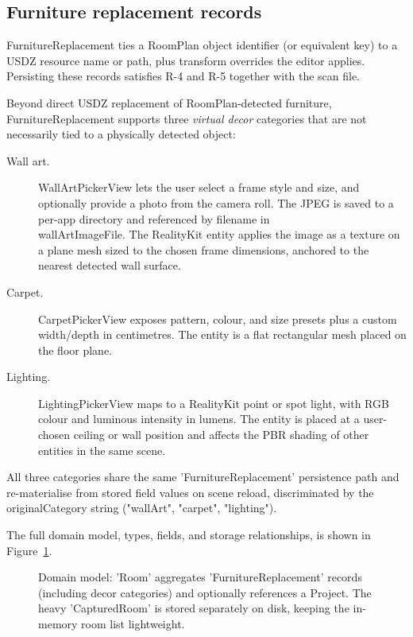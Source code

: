 \subsection{Furniture replacement records}

FurnitureReplacement ties a RoomPlan object identifier (or equivalent key) to a USDZ resource name or path, plus transform overrides the editor applies. Persisting these records satisfies R-4 and R-5 together with the scan file.

Beyond direct USDZ replacement of RoomPlan-detected furniture,
\\ 
FurnitureReplacement supports three \emph{virtual decor} categories that are not necessarily tied to a physically detected object:

\begin{description}
    \item[Wall art.] WallArtPickerView lets the user select a frame style and size, and optionally provide a photo from the camera roll. The JPEG is saved to a per-app directory and referenced by filename in \\ wallArtImageFile. The RealityKit entity applies the image as a texture on a plane mesh sized to the chosen frame dimensions, anchored to the nearest detected wall surface.

    \item[Carpet.] CarpetPickerView exposes pattern, colour, and size presets plus a custom width/depth in centimetres. The entity is a flat rectangular mesh placed on the floor plane.

    \item[Lighting.] LightingPickerView maps to a RealityKit point or spot light, with RGB colour and luminous intensity in lumens. The entity is placed at a user-chosen ceiling or wall position and affects the PBR shading of other entities in the same scene.
\end{description}

All three categories share the same 'FurnitureReplacement' persistence path and re-materialise from stored field values on scene reload, discriminated by the originalCategory string ("wallArt", "carpet", "lighting").

The full domain model, types, fields, and storage relationships, is shown in Figure~\ref{fig:domain_model}.

\begin{figure}[H]
\centering

\caption{Domain model: 'Room' aggregates 'FurnitureReplacement' records (including decor categories) and optionally references a Project. The heavy 'CapturedRoom' is stored separately on disk, keeping the in-memory room list lightweight.}
\label{fig:domain_model}
\end{figure}

